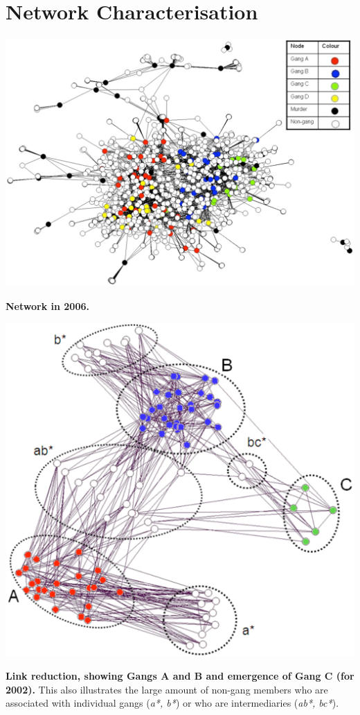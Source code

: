 \documentclass[pdftex]{beamer}
\begin{document}
\section{Network Characterisation}

\begin{frame}
\begin{center}
\includegraphics[width=0.7\paperwidth]{../images/legend2006.pdf}
\end{center}
\hfill\scriptsize{{\textbf{Network in 2006.}}}
\end{frame}

\begin{frame}
\begin{center}
\includegraphics[width=0.6\paperwidth]{../images/2002core_labelled.pdf}
\end{center}
\scriptsize{{\textbf{Link reduction, showing Gangs A and B and emergence of Gang
C (for 2002).}} This also illustrates the large amount of non-gang members who
are associated with individual gangs ({\emph{a*, b*}}) or who are intermediaries ({\emph{ab*,
bc*}}).}
\end{frame}
\end{document}
